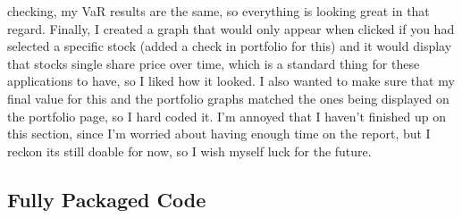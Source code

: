\documentclass{article}
\begin{document}
checking, my VaR results are the same, so everything is looking great in that regard. Finally, I created a graph that would only appear when clicked if you had selected a specific stock (added a check in portfolio for this) and it would display that stocks single share price over time, which is a standard thing for these applications to have, so I liked how it looked. I also wanted to make sure that my final value for this and the portfolio graphs matched the ones being displayed on the portfolio page, so I hard coded it. I'm annoyed that I haven't finished up on this section, since I'm worried about having enough time on the report, but I reckon its still doable for now, so I wish myself luck for the future.\\\vspace{0.3cm}




\subsection{Fully Packaged Code}
\vspace{0.5cm}
\end{document}
